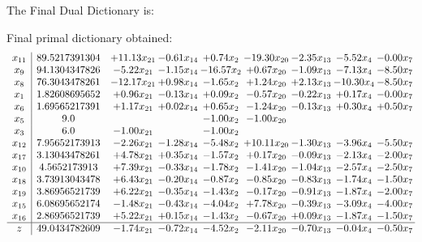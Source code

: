 \documentclass[8pt]{article}
\begin{document}
The Final Dual Dictionary is: 

 Final primal dictionary obtained: 
\[\begin{array}{c| c c@{\hskip 2pt} c@{\hskip 2pt} c@{\hskip 2pt} c@{\hskip 2pt} c@{\hskip 2pt} c@{\hskip 2pt} c@{\hskip 2pt} }
 x_{11}   &  89.5217391304 & + 11.13 x_{21} & -0.61 x_{14} & +  0.74 x_{2} & -19.30 x_{20} & -2.35 x_{13} & -5.52 x_{4} & -0.00 x_{7}\\
 x_{9}   &  94.1304347826 & -5.22 x_{21} & -1.15 x_{14} & -16.57 x_{2} & +  0.67 x_{20} & -1.09 x_{13} & -7.13 x_{4} & -8.50 x_{7}\\
 x_{8}   &  76.3043478261 & -12.17 x_{21} & +  0.98 x_{14} & -1.65 x_{2} & +  1.24 x_{20} & +  2.13 x_{13} & -10.30 x_{4} & -8.50 x_{7}\\
 x_{1}   &  1.82608695652 & +  0.96 x_{21} & -0.13 x_{14} & +  0.09 x_{2} & -0.57 x_{20} & -0.22 x_{13} & +  0.17 x_{4} & -0.00 x_{7}\\
 x_{6}   &  1.69565217391 & +  1.17 x_{21} & +  0.02 x_{14} & +  0.65 x_{2} & -1.24 x_{20} & -0.13 x_{13} & +  0.30 x_{4} & +  0.50 x_{7}\\
 x_{5}   &  9.0  &    &   & -1.00 x_{2} & -1.00 x_{20} &    &    &   \\
 x_{3}   &  6.0 & -1.00 x_{21} &   & -1.00 x_{2} &    &    &    &   \\
 x_{12}   &  7.95652173913 & -2.26 x_{21} & -1.28 x_{14} & -5.48 x_{2} & + 10.11 x_{20} & -1.30 x_{13} & -3.96 x_{4} & -5.50 x_{7}\\
 x_{17}   &  3.13043478261 & +  4.78 x_{21} & +  0.35 x_{14} & -1.57 x_{2} & +  0.17 x_{20} & -0.09 x_{13} & -2.13 x_{4} & -2.00 x_{7}\\
 x_{10}   &  4.5652173913 & +  7.39 x_{21} & -0.33 x_{14} & -1.78 x_{2} & -1.41 x_{20} & -1.04 x_{13} & -2.57 x_{4} & -2.50 x_{7}\\
 x_{18}   &  3.73913043478 & +  6.43 x_{21} & -0.20 x_{14} & -0.87 x_{2} & -0.85 x_{20} & -0.83 x_{13} & -1.74 x_{4} & -1.50 x_{7}\\
 x_{19}   &  3.86956521739 & +  6.22 x_{21} & -0.35 x_{14} & -1.43 x_{2} & -0.17 x_{20} & -0.91 x_{13} & -1.87 x_{4} & -2.00 x_{7}\\
 x_{15}   &  6.08695652174 & -1.48 x_{21} & -0.43 x_{14} & -4.04 x_{2} & +  7.78 x_{20} & -0.39 x_{13} & -3.09 x_{4} & -4.00 x_{7}\\
 x_{16}   &  2.86956521739 & +  5.22 x_{21} & +  0.15 x_{14} & -1.43 x_{2} & -0.67 x_{20} & +  0.09 x_{13} & -1.87 x_{4} & -1.50 x_{7}\\
\hline
z    &  49.0434782609 & -1.74 x_{21} & -0.72 x_{14} & -4.52 x_{2} & -2.11 x_{20} & -0.70 x_{13} & -0.04 x_{4} & -0.50 x_{7}\\
\end{array}\]
\end{document}
